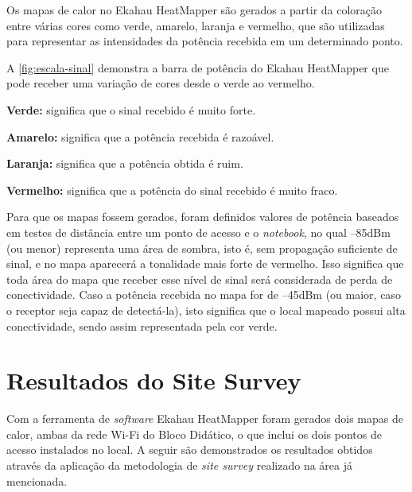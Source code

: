 Os mapas de calor no Ekahau HeatMapper são gerados a partir da coloração entre várias cores como verde, amarelo, laranja e vermelho, que são utilizadas para representar as intensidades da potência recebida em um determinado ponto.

A \autoref{fig:escala-sinal} demonstra a barra de potência do Ekahau HeatMapper que pode receber uma variação de cores desde o verde ao vermelho.

\begin{compactitem}
	\item \textbf{Verde:} significa que o sinal recebido é muito forte.
	\item \textbf{Amarelo:} significa que a potência recebida é razoável.
	\item \textbf{Laranja:} significa que a potência obtida é ruim.
	\item \textbf{Vermelho:} significa que a potência do sinal recebido é muito fraco.
\end{compactitem}

\begin{figure}[H]
	\centering
\end{figure}

Para que os mapas fossem gerados, foram definidos valores de potência baseados em testes de distância entre um ponto de acesso e o \textit{notebook}, no qual --85dBm (ou menor) representa uma área de sombra, isto é, sem propagação suficiente de sinal, e no mapa aparecerá a tonalidade mais forte de vermelho. Isso significa que toda área do mapa que receber esse nível de sinal será considerada de perda de conectividade. Caso a potência recebida no mapa for de --45dBm (ou maior, caso o receptor seja capaz de detectá-la), isto significa que o local mapeado possui alta conectividade, sendo assim representada pela cor verde.

\section{Resultados do Site Survey}
\label{sec:resultados-site-survey}

Com a ferramenta de \textit{software} Ekahau HeatMapper foram gerados dois mapas de calor, ambas da rede Wi-Fi do Bloco Didático, o que inclui os dois pontos de acesso instalados no local. A seguir são demonstrados os resultados obtidos através da aplicação da metodologia de \textit{site survey} realizado na área já mencionada.

